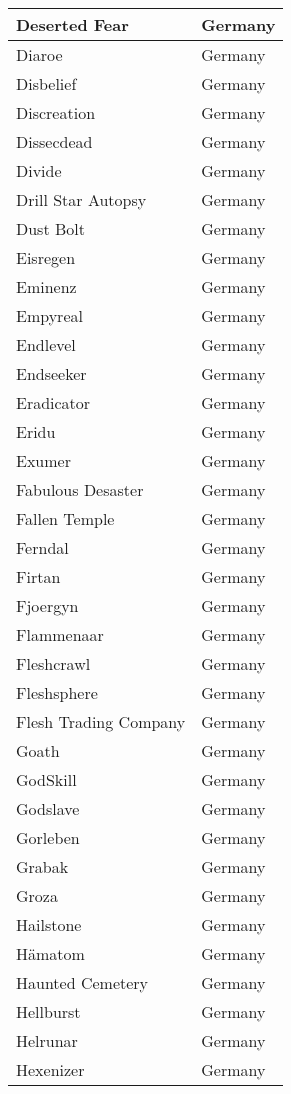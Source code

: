 \documentclass[12pt, a4paper, twoside]{report}
\begin{document}
\begin{center}
\begin{longtable}{|p{5cm}|p{5cm}|}
Deserted Fear & Germany \\ \hline
Diaroe & Germany \\ \hline
Disbelief & Germany \\ \hline
Discreation & Germany \\ \hline
Dissecdead & Germany \\ \hline
Divide & Germany \\ \hline
Drill Star Autopsy & Germany \\ \hline
Dust Bolt & Germany \\ \hline
Eisregen & Germany \\ \hline
Eminenz & Germany \\ \hline
Empyreal & Germany \\ \hline
Endlevel & Germany \\ \hline
Endseeker & Germany \\ \hline
Eradicator & Germany \\ \hline
Eridu & Germany \\ \hline
Exumer & Germany \\ \hline
Fabulous Desaster & Germany \\ \hline
Fallen Temple & Germany \\ \hline
Ferndal & Germany \\ \hline
Firtan & Germany \\ \hline
Fjoergyn & Germany \\ \hline
Flammenaar & Germany \\ \hline
Fleshcrawl & Germany \\ \hline
Fleshsphere & Germany \\ \hline
Flesh Trading Company & Germany \\ \hline
Goath & Germany \\ \hline
GodSkill & Germany \\ \hline
Godslave & Germany \\ \hline
Gorleben & Germany \\ \hline
Grabak & Germany \\ \hline
Groza & Germany \\ \hline
Hailstone & Germany \\ \hline
Hämatom & Germany \\ \hline
Haunted Cemetery & Germany \\ \hline
Hellburst & Germany \\ \hline
Helrunar & Germany \\ \hline
Hexenizer & Germany \\ \hline

\end{longtable}
\end{center}
\end{document}
